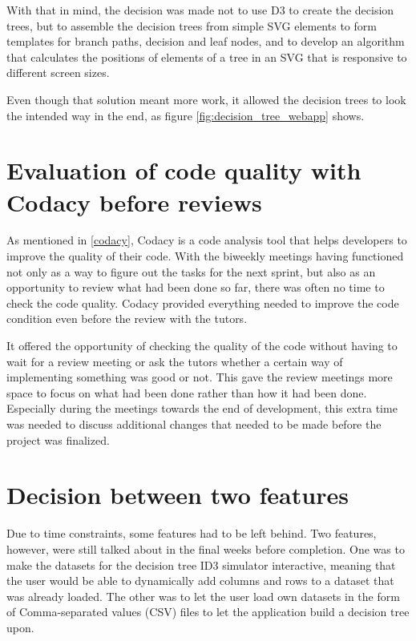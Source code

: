 With that in mind, the decision was made not to use D3 to create the decision trees, but to assemble the decision trees from simple SVG elements to form templates for branch paths, decision and leaf nodes, and to develop an algorithm that calculates the positions of elements of a tree in an SVG that is responsive to different screen sizes.

Even though that solution meant more work, it allowed the decision trees to look the intended way in the end, as figure \ref{fig:decision_tree_webapp} shows.

\section{Evaluation of code quality with Codacy before reviews}
As mentioned in \ref{codacy}, Codacy is a code analysis tool that helps developers to improve the quality of their code. With the biweekly meetings having functioned not only as a way to figure out the tasks for the next sprint, but also as an opportunity to review what had been done so far, there was often no time to check the code quality. Codacy provided everything needed to improve the code condition even before the review with the tutors.

It offered the opportunity of checking the quality of the code without having to wait for a review meeting or ask the tutors whether a certain way of implementing something was good or not.
This gave the review meetings more space to focus on what had been done rather than how it had been done. Especially during the meetings towards the end of development, this extra time was needed to discuss additional changes that needed to be made before the project was finalized.

\section{Decision between two features} \label{decision_two_features}
Due to time constraints, some features had to be left behind. Two features, however, were still talked about in the final weeks before completion. One was to make the datasets for the decision tree ID3 simulator interactive, meaning that the user would be able to dynamically add columns and rows to a dataset that was already loaded. The other was to let the user load own datasets in the form of Comma-separated values (CSV) files to let the application build a decision tree upon.

